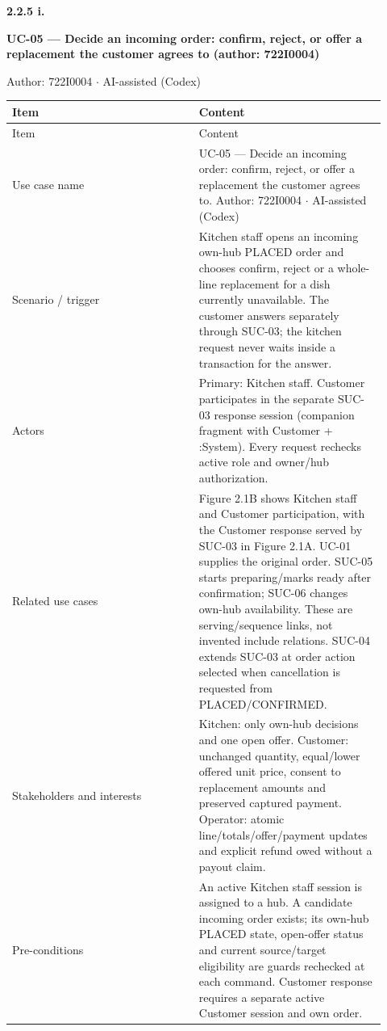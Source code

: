 \textbf{2.2.5 i.}\par
\textbf{UC-05 --- Decide an incoming order: confirm, reject, or offer a replacement the customer agrees to (author: 722I0004)}

Author: 722I0004 \ensuremath{\cdot} AI-assisted (Codex)

\begin{longtable}{>{\raggedright\arraybackslash}p{0.4600\linewidth}>{\raggedright\arraybackslash}p{0.4600\linewidth}}
Item & Content \\
\hline\endfirsthead
Item & Content \\
\hline\endhead
Use case name & UC-05 --- Decide an incoming order: confirm, reject, or offer a replacement the customer agrees to. Author: 722I0004 \ensuremath{\cdot} AI-assisted (Codex) \\
Scenario / trigger & Kitchen staff opens an incoming own-hub PLACED order and chooses confirm, reject or a whole-line replacement for a dish currently unavailable. The customer answers separately through SUC-03; the kitchen request never waits inside a transaction for the answer. \\
Actors & Primary: Kitchen staff. Customer participates in the separate SUC-03 response session (companion fragment with Customer + :System). Every request rechecks active role and owner/hub authorization. \\
Related use cases & Figure 2.1B shows Kitchen staff and Customer participation, with the Customer response served by SUC-03 in Figure 2.1A. UC-01 supplies the original order. SUC-05 starts preparing/marks ready after confirmation; SUC-06 changes own-hub availability. These are serving/sequence links, not invented \guillemotleft{}include\guillemotright{} relations. SUC-04 extends SUC-03 at order action selected when cancellation is requested from PLACED/CONFIRMED. \\
Stakeholders and interests & Kitchen: only own-hub decisions and one open offer. Customer: unchanged quantity, equal/lower offered unit price, consent to replacement amounts and preserved captured payment. Operator: atomic line/totals/offer/payment updates and explicit refund owed without a payout claim. \\
Pre-conditions & An active Kitchen staff session is assigned to a hub. A candidate incoming order exists; its own-hub PLACED state, open-offer status and current source/target eligibility are guards rechecked at each command. Customer response requires a separate active Customer session and own order. \\

\end{longtable}

